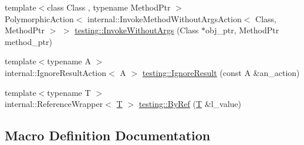 \begin{DoxyCompactItemize}
{\footnotesize template$<$class Class , typename Method\+Ptr $>$ }\\Polymorphic\+Action$<$ internal\+::\+Invoke\+Method\+Without\+Args\+Action$<$ Class, Method\+Ptr $>$ $>$ \hyperlink{namespacetesting_ab75325d71a8c37db94f349243815c728}{testing\+::\+Invoke\+Without\+Args} (Class $\ast$obj\+\_\+ptr, Method\+Ptr method\+\_\+ptr)
\item 
{\footnotesize template$<$typename A $>$ }\\internal\+::\+Ignore\+Result\+Action$<$ A $>$ \hyperlink{namespacetesting_a50ae42540a31047c7fddd32df8d835f5}{testing\+::\+Ignore\+Result} (const A \&an\+\_\+action)
\item 
{\footnotesize template$<$typename T $>$ }\\internal\+::\+Reference\+Wrapper$<$ \hyperlink{functions__7_8js_adf1f3edb9115acb0a1e04209b7a9937b}{T} $>$ \hyperlink{namespacetesting_aaee6d42dcd69de6e7a1459c5c71222c3}{testing\+::\+By\+Ref} (\hyperlink{functions__7_8js_adf1f3edb9115acb0a1e04209b7a9937b}{T} \&l\+\_\+value)
\end{DoxyCompactItemize}


\subsection{Macro Definition Documentation}
